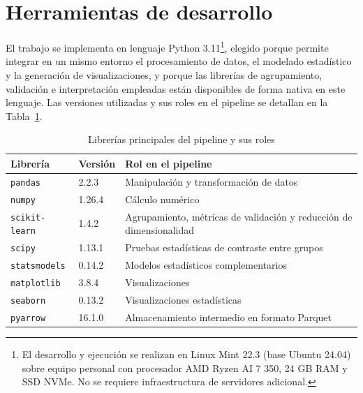\section{Herramientas de desarrollo}
\label{sec:herramientas}

El trabajo se implementa en lenguaje Python 3.11\footnote{El desarrollo y
ejecución se realizan en Linux Mint 22.3 (base Ubuntu 24.04) sobre equipo personal
con procesador AMD Ryzen AI 7 350, 24 GB RAM y SSD NVMe. No se requiere
infraestructura de servidores adicional.}, elegido porque permite integrar en un
mismo entorno el procesamiento de datos, el modelado estadístico y la generación
de visualizaciones, y porque las librerías de agrupamiento, validación e
interpretación empleadas están disponibles de forma nativa en este lenguaje.
Las versiones utilizadas y sus roles en el pipeline se detallan en la
Tabla~\ref{tab:software}.

\begin{table}[H]
\centering
\caption{Librerías principales del pipeline y sus roles}
\label{tab:software}
\begin{tabularx}{\textwidth}{ll>{\raggedright\arraybackslash}X}
\hline
\textbf{Librería} & \textbf{Versión} & \textbf{Rol en el pipeline} \\
\hline
\texttt{pandas}      & 2.2.3  & Manipulación y transformación de datos \\
\texttt{numpy}       & 1.26.4 & Cálculo numérico \\
\texttt{scikit-learn} & 1.4.2  & Agrupamiento, métricas de validación y reducción de dimensionalidad~\citep{Pedregosa2011} \\
\texttt{scipy}       & 1.13.1 & Pruebas estadísticas de contraste entre grupos \\
\texttt{statsmodels} & 0.14.2 & Modelos estadísticos complementarios \\
\texttt{matplotlib}  & 3.8.4  & Visualizaciones \\
\texttt{seaborn}     & 0.13.2 & Visualizaciones estadísticas \\
\texttt{pyarrow}     & 16.1.0 & Almacenamiento intermedio en formato Parquet \\
\hline
\end{tabularx}
\end{table}

